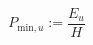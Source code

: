 \begin{equation}
	P_{\text{min},u} := \frac{E_u}{H}
	\label{ch3:equ:power-charge-minimum}
\end{equation}